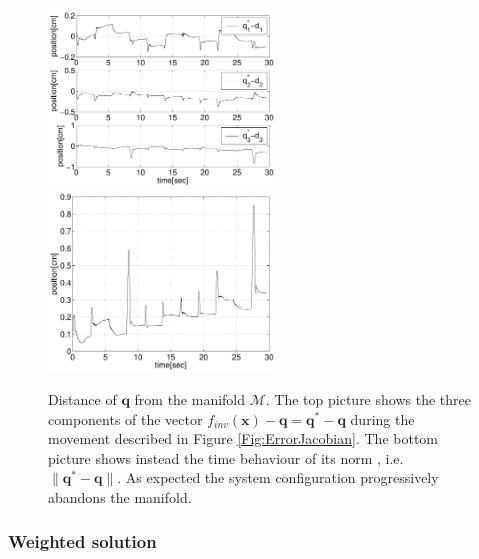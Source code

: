 \documentclass[conference]{IEEEtran}
\numberwithin{equation}{section}
\newcommand{\q}{\mathbf{q}}
\newcommand{\x}{\mathbf{x}}
\begin{document}
\begin{figure}[tbp]
\centering 
\includegraphics[width=60mm]{image/ManifoldDistanceQJacobian.pdf} 
\includegraphics[width=60mm]{image/ManifoldDistanceJacobian.pdf} 
\caption{Distance of $\q$ from the manifold $\mathcal M$. The top picture shows the three components of the vector $f_{inv}(\x) -\q  = \q^* -\q$ during the movement described in Figure \ref{Fig:ErrorJacobian}. The bottom picture shows instead the time behaviour of its norm , i.e. $\| \q^* - \q \|$. As expected the system configuration progressively abandons the manifold.}
\label{Fig:ManifoldDistanceJacobian}
\end{figure}

\subsubsection{Weighted solution} \label{Sec:WeightedSolution}
\end{document}

